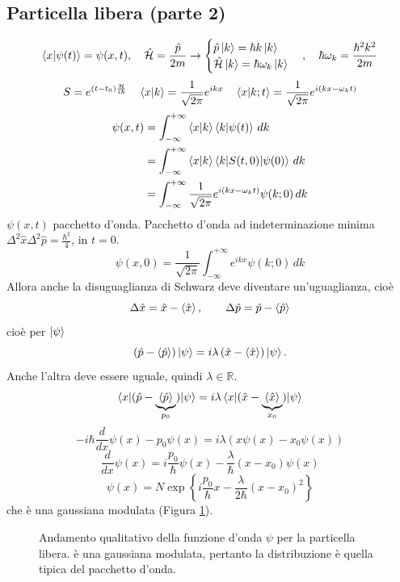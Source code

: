 \subsection{Particella libera (parte 2)}
\[
\braket{x|\psi(t)} = \psi(x, t), \quad \hat{\mathcal{H}} = \frac{\hat{p}}{2m} \rightarrow \begin{cases} 
\hat{p} \ket{k} = \hbar k \ket{k} \\
\hat{\mathcal{H}} \ket{k} = \hbar \omega_k \ket{k}
\end{cases}, \quad \hbar \omega_k = \frac{\hbar^2 k^2}{2m}
\]
\[
S = e^{(t - t_0)\frac{\mathcal{H}}{i \hbar}} \quad \braket{x|k} = \frac{1}{\sqrt{2\pi}} e^{ikx} \quad \braket{x|k; t} = \frac{1}{\sqrt{2\pi}} e^{i(kx - \omega_k t)}
\]
\begin{align*}
\psi(x, t) &= \int_{-\infty}^{+\infty} \braket{x|k} \braket{k|\psi(t)} \, dk \\
&= \int_{-\infty}^{+\infty} \braket{x|k} \braket{k|S(t, 0)|\psi(0)} \, dk \\
&= \int_{-\infty}^{+\infty} \frac{1}{\sqrt{2\pi}} e^{i(kx - \omega_k t)} \psi(k; 0) \, dk
\end{align*}
\( \psi(x, t) \) pacchetto d'onda. Pacchetto d'onda ad indeterminazione minima \( \Delta^2 \hat{x} \Delta^2 \hat{p} = \frac{\hbar^2}{4} \), in \( t = 0 \).
\[
\psi(x, 0) = \frac{1}{\sqrt{2\pi}} \int_{-\infty}^{+\infty} e^{ikx} \psi(k; 0) \, dk
\]
Allora anche la disuguaglianza di Schwarz deve diventare un'uguaglianza, cioè
\[
\Delta \hat{x} = \hat{x} - \braket{\hat{x}}, \qquad \Delta \hat{p} = \hat{p} - \braket{\hat{p}}
\]
cioè per \( \ket{\psi} \)
\[
\left( \hat{p} - \braket{\hat{p}} \right) \ket{\psi} = i \lambda \left( \hat{x} - \braket{\hat{x}} \right) \ket{\psi}.
\]
Anche l'altra deve essere uguale, quindi \( \lambda \in \mathbb{R} \).
\[
\braket{x|(\hat{p} - \underbrace{\braket{\hat{p}}}_{p_0})|\psi} = i \lambda \braket{x|(\hat{x} - \underbrace{\braket{\hat{x}}}_{x_0})| \psi}
\]
\[
-i \hbar \frac{d}{dx} \psi(x) - p_0 \psi(x) = i \lambda \left( x\psi(x) - x_0 \psi(x) \right)
\]
\[
\frac{d}{dx} \psi(x) = i \frac{p_0}{\hbar} \psi(x) - \frac{\lambda}{\hbar} (x - x_0) \psi(x)
\]
\[
\psi(x) = N \exp \left\{ i\frac{p_0}{\hbar} x - \frac{\lambda}{2\hbar} (x - x_0)^2 \right\}
\]
che è una gaussiana modulata (Figura \ref{gaussiana_modulata}).
\begin{figure}
\centering
{}
\caption{Andamento qualitativo della funzione d'onda \(\psi\) per la particella libera. è una gaussiana modulata, pertanto la distribuzione è quella tipica del pacchetto d'onda.}
\label{gaussiana_modulata}
\end{figure}
